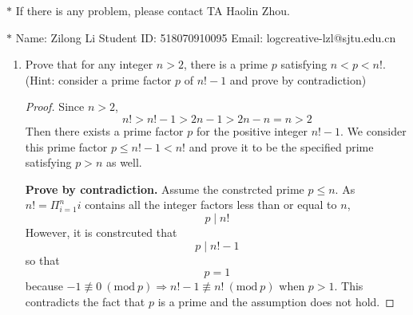 \documentclass[12pt,a4paper]{article}
\theoremstyle{definition}
\begin{document}
\noindent

\noindent{}
\begin{center}
\footnotesize{\color{red}$*$ If there is any problem, please contact TA Haolin Zhou.}

\footnotesize{\color{blue}$*$ Name: Zilong Li  \quad Student ID: 518070910095 \quad Email: logcreative-lzl@sjtu.edu.cn}
\end{center}

\begin{enumerate}
    \item
    Prove that for any integer $n>2$, there is a prime $p$ satisfying $n<p<n!$. {\color{blue}(Hint: consider a prime factor $p$ of $n!-1$ and prove by contradiction)}
   \begin{proof}


        Since $n>2$,
        \begin{equation*}
            n!>n!-1>2n-1>2n-n=n>2
        \end{equation*}
        Then there exists a prime factor $p$ for the positive integer $n!-1$. We consider this prime factor $p\leq n!-1<n!$ and prove it to be the specified prime satisfying $p>n$ as well.

        \textbf{Prove by contradiction.} Assume the constrcted prime $p\leq n$. As $n!=\Pi_{i=1}^n i$ contains all the integer factors less than or equal to $n$, 
        \begin{equation*}
            p\mid n!
        \end{equation*}
        However, it is constrcuted that
        \begin{equation*}
            p\mid n!-1
        \end{equation*}
        so that
        \begin{equation*}
            p=1
        \end{equation*}
        because $-1\not\equiv 0~(\text{mod}~p)\Rightarrow n!-1\not\equiv n!~(\text{mod}~p)$ when $p>1$. This contradicts the fact that $p$ is a prime and the assumption does not hold.


\end{proof}
\end{enumerate}
\end{document}
